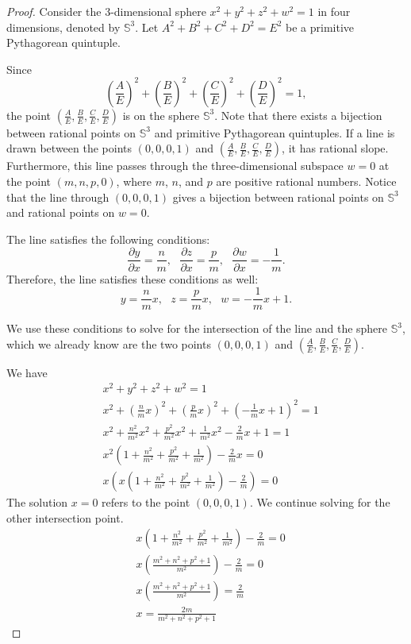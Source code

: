 \documentclass[12pt,table]{article}
\theoremstyle{definition}
\theoremstyle{remark}
\newcommand{\Sss}{\mathbb S}
\numberwithin{equation}{section}
\begin{document}
\begin{proof}
Consider the $3$-dimensional
sphere $x^2 + y^2 + z^2 +w^2 =1$
in four dimensions,
denoted by $\Sss^3$.
Let $A^2 +B^2 +C^2 + D^2 = E^2$ be a primitive Pythagorean quintuple.


Since 
$$
     \left(\frac{A}{E}\right)^2 +\left(\frac{B}{E}\right)^2+
     \left(\frac{C}{E}\right)^2+\left(\frac{D}{E}\right)^2 = 1,
$$
the point $(\frac{A}{E},\frac{B}{E},\frac{C}{E},\frac{D}{E})$ 
is on the sphere $\Sss^3$. 
Note that there exists a bijection between rational 
points on $\Sss^3$ and primitive Pythagorean quintuples.
If a line is drawn between the points $(0,0,0,1)$ and
$(\frac{A}{E},\frac{B}{E},\frac{C}{E},\frac{D}{E})$,
it has rational slope.
Furthermore, 
this line passes through the three-dimensional 
subspace $w=0$ at the point $(m,n,p,0)$,
where 
$m$, $n$, and $p$ are positive rational numbers. 
Notice that the line through $(0,0,0,1)$ gives a
bijection between rational
points on $\Sss^3$ and rational points on $w=0$.


The line satisfies the following conditions:
$$
     \frac{\partial y}{\partial x} =\frac{n}{m} ,\:\:\: 
     \frac{\partial z}{\partial x}=\frac{p}{m}, \:\:\:
     \frac{\partial w}{\partial x}=-\frac{1}{m}.
$$
Therefore, the line satisfies these conditions as well:
$$
      y=\frac{n}{m}x , \:\:\: z=\frac{p}{m}x, \:\:\:w=-\frac{1}{m}x+1.
$$

We use these conditions to solve for the intersection
 of the line and the sphere $\Sss^3$, which 
we already know are the two points $(0,0,0,1)$ and 
 $(\frac{A}{E},\frac{B}{E},\frac{C}{E},\frac{D}{E})$.


We have
\begin{align*}
     & x^2 + y^2 + z^2 +w^2 =1
\\
     & x^2 + \left(\frac{n}{m}x\right)^2 + 
        \left(\frac{p}{m}x\right)^2 
        +\left(-\frac{1}{m}x+1\right)^2 = 1
\\
     & x^2 + \frac{n^2}{m^2}x^2 + \frac{p^2}{m^2}x^2
        +\frac{1}{m^2}x^2-\frac{2}{m}x+1=1
\\
     & x^2\left(1 + \frac{n^2}{m^2} + \frac{p^2}{m^2} 
       +\frac{1}{m^2}\right)-\frac{2}{m}x = 0
\\
     & x\left(x\left(1 + \frac{n^2}{m^2} + \frac{p^2}{m^2} 
        +\frac{1}{m^2}\right)-\frac{2}{m}\right) = 0
\end{align*}
The solution $x=0$ refers to the point $(0,0,0,1)$.
We continue solving for the other intersection point.
\begin{align*}
     & x\left(1 + \frac{n^2}{m^2} + \frac{p^2}{m^2} 
      +\frac{1}{m^2}\right)-\frac{2}{m}=0     
\\
     & x\left(\frac{m^2 + n^2 + p^2 +1}{m^2}\right)-\frac{2}{m}=0     
\\
     & x\left(\frac{m^2 + n^2 + p^2 +1}{m^2}\right)=\frac{2}{m}     
\\
     & x = \frac{2m}{m^2 + n^2 + p^2 +1}     
\end{align*}




\end{proof}
\end{document}
